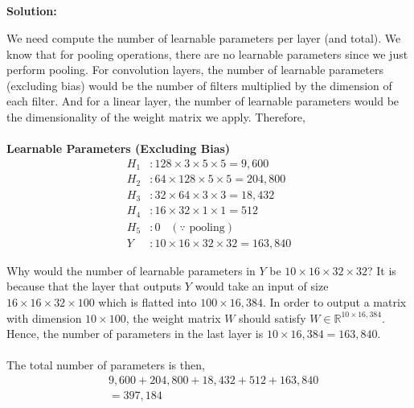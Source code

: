 \documentclass{article}
\newenvironment{solution}
  {\par\noindent\textbf{Solution:}\par}
  {\par}
\begin{document}
\subsection{}
\begin{solution}
  We need compute the number of learnable parameters per layer (and total). We know that for pooling operations, there are no learnable parameters since we just perform pooling. 
  For convolution layers, the number of learnable parameters (excluding bias) would be the number of filters multiplied by the dimension of each filter. And for a linear layer, the 
  number of learnable parameters would be the dimensionality of the weight matrix we apply. Therefore,
\\ \\ 
  \textbf{Learnable Parameters (Excluding Bias)}
  \[
    \begin{aligned}
    H_1 &: 128 \times 3 \times 5 \times 5 =9,600\\ 
    H_2 &:  64 \times 128 \times 5 \times 5 = 204,800 \\  
    H_3 &: 32 \times 64 \times 3 \times 3 = 18,432 \\ 
    H_4 &: 16 \times 32 \times 1  \times 1 = 512 \\ 
    H_5 &: 0 \;\;\; \left( \because \text{ pooling} \right) \\  
    Y &: 10 \times 16 \times 32 \times 32 = 163,840 
  \end{aligned}
  \]

  Why would the number of learnable parameters in $Y$ be $10 \times 16 \times 32 \times 32$? It is because that the layer that outputs $Y$ would take an input of size 
  $16 \times 16 \times 32 \times 100 $ which is flatted into $100 \times 16,384$. In order to output a matrix with dimension $10 \times 100$, the weight matrix $W$ should satisfy $W \in \mathbb{R}^{10 \times 16,384}$.
  Hence, the number of parameters in the last layer is $10 \times 16,384 = 163,840$.
  \\ \\  
  The total number of parameters is then, 
  \[
\begin{aligned}
  & 9,600  + 204,800 + 18,432 + 512 + 163,840 \\  
  &= 397,184 
\end{aligned}
  \]
\end{solution}
\end{document}
